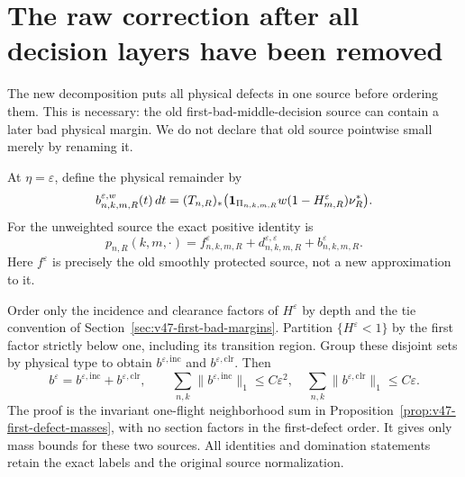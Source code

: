 \section{The raw correction after all decision layers have been removed}
\label{sec:v48-physical-remainder}
The new decomposition puts all physical defects in one source before
ordering them. This is necessary: the old first-bad-middle-decision
source can contain a later bad physical margin. We do not declare that
old source pointwise small merely by renaming it.

At $\eta=\varepsilon$, define the physical remainder by
\begin{equation}\label{eq:v48-physical-remainder}
 b^{\varepsilon,w}_{n,k,m,R}(t)\,dt
 =(T_{n,R})_*\bigl(\one_{\Pi_{n,k,m,R}}w
                         (1-H_{m,R}^{\varepsilon})\nu_R^*\bigr).
\end{equation}
For the unweighted source the exact positive identity is
\begin{equation}\label{eq:v48-full-density-split}
 p_{n,R}(k,m,\cdot)=f^{\varepsilon}_{n,k,m,R}
                +d^{\varepsilon,\varepsilon}_{n,k,m,R}
                +b^{\varepsilon}_{n,k,m,R}.
\end{equation}
Here $f^\varepsilon$ is precisely the old smoothly protected source,
not a new approximation to it.

Order only the incidence and clearance factors of $H^\varepsilon$
by depth and the tie convention of Section~\ref{sec:v47-first-bad-margins}.
Partition $\{H^\varepsilon<1\}$ by the first factor strictly below
one, including its transition region. Group these disjoint sets by
physical type to obtain $b^{\varepsilon,\mathrm{inc}}$ and
$b^{\varepsilon,\mathrm{clr}}$. Then
\begin{equation}\label{eq:v48-two-physical-types}
 b^\varepsilon=b^{\varepsilon,\mathrm{inc}}
                     +b^{\varepsilon,\mathrm{clr}},\qquad
 \sum_{n,k}\|b^{\varepsilon,\mathrm{inc}}\|_1\le C\varepsilon^2,
 \quad
 \sum_{n,k}\|b^{\varepsilon,\mathrm{clr}}\|_1\le C\varepsilon.
\end{equation}
The proof is the invariant one-flight neighborhood sum in
Proposition~\ref{prop:v47-first-defect-masses}, with no section factors
in the first-defect order. It gives only mass bounds for these two
sources. All identities and domination statements retain the exact
labels and the original source normalization.

